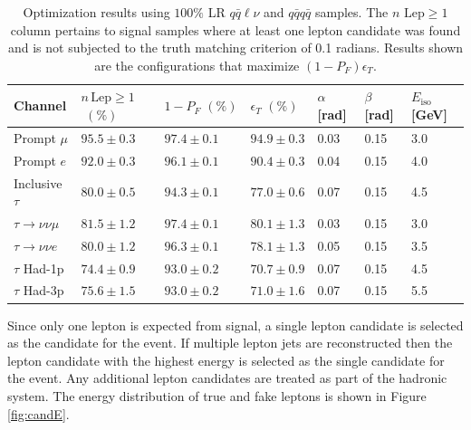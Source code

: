 \begin{table}

\begin{tabular}{|p{}|p{}p{}p{}p{}p{}p{}|}

\hline 
Channel & $n\,\text{Lep}\geq 1$ $\,\, (\%)$ & $1-P_{F} \, \, (\%)$ & $\epsilon_T \, \, (\%)$ & $\alpha$ [rad] & $\beta$ [rad] & $E_{\text{iso}}$ [GeV] \\ 
\hline 
Prompt $\mu$ & $95.5 \pm 0.3$ & $97.4 \pm 0.1$ & $94.9 \pm 0.3$ & 0.03 & 0.15 & 3.0 \\ 

Prompt $e$ & $92.0 \pm 0.3$ & $96.1 \pm 0.1$ & $90.4 \pm 0.3$ & 0.04 & 0.15 & 4.0 \\ 

Inclusive $\tau$ & $80.0 \pm 0.5$ & $94.3 \pm 0.1$ &  $77.0 \pm 0.6$ & 0.07 & 0.15 & 4.5 \\ 


 \hline
$\tau \rightarrow \nu \nu \mu$ & $81.5 \pm 1.2$ & $97.4 \pm 0.1$ & $80.1 \pm 1.3$ & 0.03 & 0.15 & 3.0 \\ 
 
$\tau \rightarrow \nu \nu e$ &  $80.0 \pm 1.2$ & $96.3 \pm 0.1$ &  $78.1 \pm 1.3$ & 0.05 & 0.15 & 3.5 \\ 
 
$\tau$ Had-1p & $74.4 \pm 0.9$ & $93.0 \pm 0.2$ & $70.7 \pm 0.9$ & 0.07 & 0.15 & 4.5 \\ 
 
$\tau$ Had-3p &  $75.6 \pm 1.5$ & $93.0 \pm 0.2$ & $71.0 \pm 1.6$ & 0.07 & 0.15 & 5.5  \\
\hline
\end{tabular} 
\caption{Optimization results using $100 \%$ LR $q\bar{q}\ell \nu$ and $q\bar{q} q\bar{q}$ samples. The $n \, \, \text{Lep} \geq 1$ column pertains to signal samples where at least one lepton candidate was found and is not subjected to the truth matching criterion of 0.1 radians. Results shown are the configurations that maximize $(1-P_F)\epsilon_T$. }
\label{tab:taufinderopt}
\end{table}

Since only one lepton is expected from signal, a single lepton candidate is selected as the candidate for the event. If multiple lepton jets are reconstructed then the lepton candidate with the highest energy is selected as the single candidate for the event. Any additional lepton candidates are treated as part of the hadronic system. The energy distribution of true and fake leptons is shown in Figure \ref{fig:candE}.


